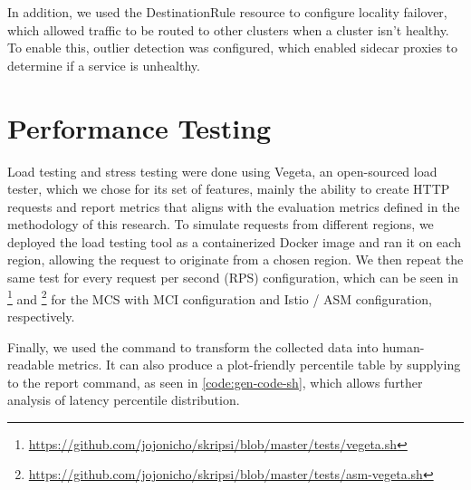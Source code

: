 \vspace{\baselineskip}
\noindent
\begin{minipage}{\linewidth}

% 
\end{minipage}

In addition, we used the DestinationRule resource to configure locality failover, which allowed traffic to be routed to other clusters when a cluster isn't healthy. To enable this, outlier detection was configured, which enabled sidecar proxies to determine if a service is unhealthy.

\section{Performance Testing}
\label{sec:load-testing-implementation}
Load testing and stress testing were done using Vegeta, an open-sourced load tester, which we chose for its set of features, mainly the ability to create HTTP requests and report metrics that aligns with the evaluation metrics defined in the methodology of this research. To simulate requests from different regions, we deployed the load testing tool as a containerized Docker image and ran it on each region, allowing the request to originate from a chosen region. We then repeat the same test for every request per second (RPS) configuration, which can be seen in \footnote{\url{https://github.com/jojonicho/skripsi/blob/master/tests/vegeta.sh}} and \footnote{\url{https://github.com/jojonicho/skripsi/blob/master/tests/asm-vegeta.sh}} for the MCS with MCI configuration and Istio / ASM configuration, respectively.

Finally, we used the  command to transform the collected data into human-readable metrics. It can also produce a plot-friendly percentile table by supplying  to the report command, as seen in \autoref{code:gen-code-sh}, which allows further analysis of latency percentile distribution.


